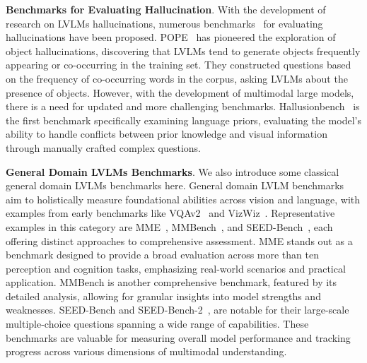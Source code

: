 \noindent\textbf{Benchmarks for Evaluating Hallucination}. With the development of research on LVLMs hallucinations, numerous benchmarks~\citep{LiDZWZW23,liu2024phd,liu2023hallusionbench,jiang2024hal,lovenia2023negative,huang2024visual,kaul2024throne,fieback2024metatoken,jing2023faithscore,cui2023holistic,wang2023llm,wang2024mitigating,chen2024unified,cha2024visually,sun2023aligning,zheng2024reefknot,xu2023lvlm,sun2024crosscheckgpt,qu2024look,wang2024understanding} for evaluating hallucinations have been proposed. POPE~\citep{LiDZWZW23} has pioneered the exploration of object hallucinations, discovering that LVLMs tend to generate objects frequently appearing or co-occurring in the training set. They constructed questions based on the frequency of co-occurring words in the corpus, asking LVLMs about the presence of objects. However, with the development of multimodal large models, there is a need for updated and more challenging benchmarks. Hallusionbench~\citep{liu2023hallusionbench} is the first benchmark specifically examining language priors, evaluating the model's ability to handle conflicts between prior knowledge and visual information through manually crafted complex questions.

\noindent\textbf{General Domain LVLMs Benchmarks}. We also introduce some classical general domain LVLMs benchmarks here. General domain LVLM benchmarks aim to holistically measure foundational abilities across vision and language, with examples from early benchmarks like VQAv2~\cite{goyal2017making} and VizWiz~\cite{gurari2018vizwiz}. Representative examples in this category are MME~\cite{abs-2306-13394}, MMBench~\cite{liu2024mmbench}, and SEED-Bench~\cite{li2024seed}, each offering distinct approaches to comprehensive assessment. MME stands out as a benchmark designed to provide a broad evaluation across more than ten perception and cognition tasks, emphasizing real-world scenarios and practical application. MMBench is another comprehensive benchmark, featured by its detailed analysis, allowing for granular insights into model strengths and weaknesses. SEED-Bench and SEED-Bench-2~\cite{abs-2311-17092}, are notable for their large-scale multiple-choice questions spanning a wide range of capabilities. These benchmarks are valuable for measuring overall model performance and tracking progress across various dimensions of multimodal understanding.